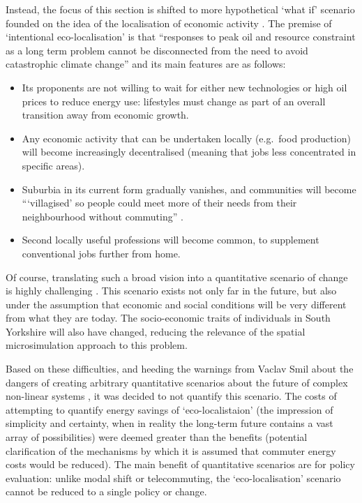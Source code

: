 Instead, the focus of this section is shifted to more hypothetical `what if' scenario
founded on the idea of the localisation of economic activity \citep{North2010585}.
The
premise of `intentional eco-localisation' is that ``responses to peak oil and resource
constraint as a long term problem cannot be disconnected from the
need to avoid catastrophic climate change'' \citep[p.~585]{North2010585} and its main
features are as follows:
\begin{itemize}
 \item Its proponents are not willing to wait for either new technologies or
 high oil prices to reduce energy use: lifestyles must change as part of an
 overall transition away from economic growth.
 \item Any economic activity that can be undertaken locally (e.g.~food production)
 will become increasingly
 decentralised (meaning that jobs less concentrated in specific areas).
 \item Suburbia in its current form gradually vanishes, and communities
 will become ```villagised' so people could meet more of their needs from their
neighbourhood without commuting'' \citep[p.~591]{North2010585}.
 \item Second locally useful professions will become common,
 to supplement conventional jobs further from home.
\end{itemize}
Of course, translating such a broad vision into a quantitative scenario
of change is highly challenging \citep{Winther2013}. This scenario
exists not only far in the future, but also under the assumption that
economic and social conditions will be very different from what they are today.
The socio-economic traits of individuals in South Yorkshire will also have
changed, reducing the relevance of the spatial microsimulation approach to this
problem.

Based on these difficulties, and heeding the warnings from Vaclav Smil about the dangers
of creating arbitrary quantitative scenarios about the future of complex non-linear systems
\citep{smil2000perils, Smil2008}, it was decided to not quantify this scenario.
The costs of attempting to quantify energy savings of `eco-localistaion'
(the impression of simplicity and certainty, when in reality the long-term future
contains a vast array of possibilities) were deemed greater
than the benefits (potential clarification of the mechanisms by which it is assumed that
commuter energy costs would be reduced). The main benefit of quantitative
scenarios are for policy evaluation: unlike modal shift or telecommuting,
the `eco-localisation' scenario cannot be reduced to a single policy or change.

